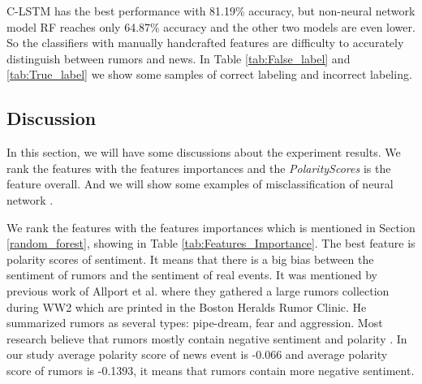 C-LSTM has the best performance with 81.19\% accuracy, but non-neural network model RF reaches only 64.87\% accuracy and the other two models are even lower. So the classifiers with manually handcrafted features are difficulty to accurately distinguish between rumors and news. In Table \ref{tab:False_label} and \ref{tab:True_label} we show some samples of correct labeling and incorrect labeling.
 
 \begin{table}[!h]
 \centering
{}
 \caption{Prediction Accuracy of Different Single Tweet's Creditability Scoring Models}
 \label{tab:single_result}
\end{table}
 
 \subsection{Discussion}  
In this section, we will have some discussions about  the experiment results.  We rank the features with the features importances and the \emph{PolarityScores} is the feature overall. And we will show some examples of misclassification of neural network .
 
 We rank the features with the features importances which is mentioned in Section \ref{random_forest}, showing in Table \ref{tab:Features_Importance}. The best feature is polarity scores of sentiment. It means that there is a big bias between the sentiment of rumors and the sentiment of real events. It was mentioned by previous work of Allport et al. \cite{allport1947psychology} where they gathered a large rumors collection during WW2 which are printed in the Boston Heralds Rumor Clinic. He summarized rumors as several types:  pipe-dream, fear and aggression. Most research believe that rumors mostly contain negative sentiment and polarity \cite{kwon2013aspects}\cite{sunstein2014rumors}. In our study average polarity score of news event is -0.066 and average polarity score of rumors is -0.1393, it means that rumors contain more negative sentiment. 
 
